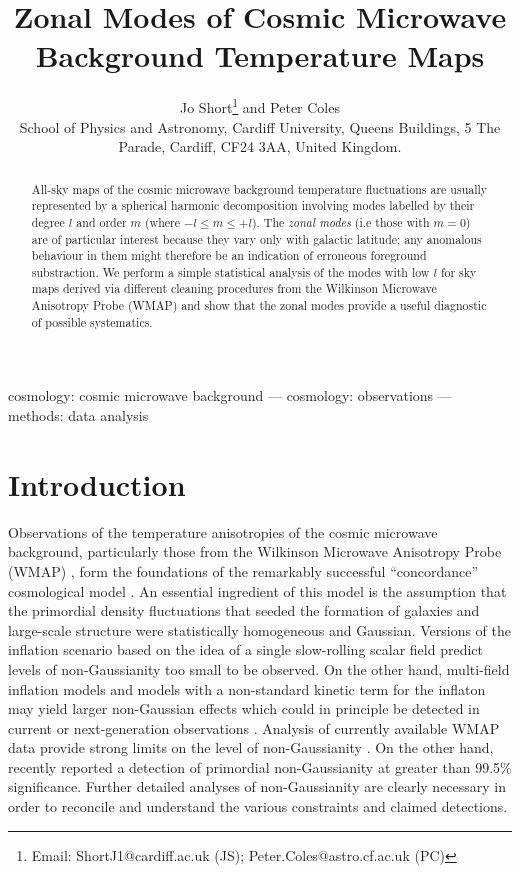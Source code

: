 \documentclass[useAMS,usenatbib,usegraphicx]{mn2e}
\title[Zonal Modes of CMB Temperature Maps]{Zonal Modes of Cosmic Microwave Background Temperature Maps}
\author[Short \& Coles]{Jo Short\thanks{Email: ShortJ1@cardiff.ac.uk (JS); Peter.Coles@astro.cf.ac.uk (PC)}
 and Peter Coles\\
 School of Physics and Astronomy, Cardiff University,
  Queens Buildings, 5 The Parade, Cardiff, CF24 3AA, United Kingdom.}
\begin{document}
\maketitle

\begin{abstract}
All-sky maps of the cosmic microwave background temperature
fluctuations are usually represented by a spherical harmonic
decomposition involving modes labelled by their degree $l$ and order
$m$ (where $-l\leq m \leq +l$). The {\em zonal modes} (i.e those
with $m=0$) are of particular interest because they vary only with
galactic latitude; any anomalous behaviour in them might therefore
be an indication of erroneous foreground substraction. We perform a
simple statistical analysis of the modes with low $l$ for sky maps
derived via different cleaning procedures from the Wilkinson
Microwave Anisotropy Probe (WMAP) and show that the zonal modes
provide a useful diagnostic of possible systematics.
\end{abstract}

\begin{keywords}
cosmology: cosmic microwave background --- cosmology: observations
--- methods: data analysis
\end{keywords}


\section{Introduction}

Observations of the temperature anisotropies of the cosmic microwave
background, particularly those from the Wilkinson Microwave
Anisotropy Probe (WMAP) \citep{b1,b3}, form the foundations of 
the remarkably successful ``concordance'' cosmological model
\citep{Colesb}.  An essential ingredient of this model is the
assumption that the primordial density fluctuations that seeded the
formation of galaxies and large-scale structure were statistically
homogeneous and Gaussian. Versions of the inflation scenario based
on the idea of a single slow-rolling scalar field predict levels of
non-Gaussianity too small to be observed. On the other hand,
multi-field inflation models and models with a non-standard kinetic
term for the inflaton may yield larger non-Gaussian effects which
could in principle be detected in current or next-generation
observations
\citep{BMR2002,BU2002,lyth2003,dvali2004,ACMZ2004,AST2004,BKMR2004,Chen2007,BB2007,KMVW2007}.
Analysis of currently available WMAP data provide strong limits on
the level of non-Gaussianity
\citep{Komatsu2003,Spergel2007,Creminelli2007,hikage}. On the other
hand, \citet{YW2007} recently reported a detection of primordial
non-Gaussianity at greater than 99.5\% significance. Further
detailed analyses of non-Gaussianity are clearly necessary in order
to reconcile and understand the various constraints and claimed
detections.
\end{document}
